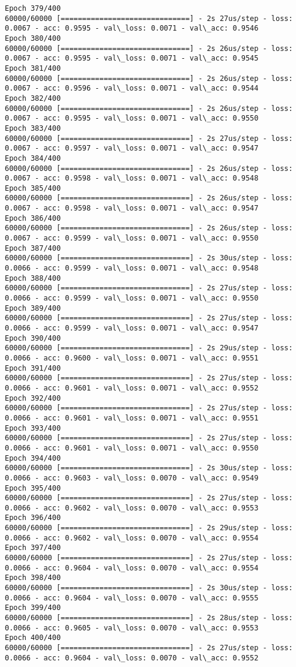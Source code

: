 \documentclass[11pt]{article}
\begin{document}
\begin{Verbatim}[commandchars=\\\{\}]
Epoch 379/400
60000/60000 [==============================] - 2s 27us/step - loss: 0.0067 - acc: 0.9595 - val\_loss: 0.0071 - val\_acc: 0.9546
Epoch 380/400
60000/60000 [==============================] - 2s 26us/step - loss: 0.0067 - acc: 0.9595 - val\_loss: 0.0071 - val\_acc: 0.9545
Epoch 381/400
60000/60000 [==============================] - 2s 26us/step - loss: 0.0067 - acc: 0.9596 - val\_loss: 0.0071 - val\_acc: 0.9544
Epoch 382/400
60000/60000 [==============================] - 2s 26us/step - loss: 0.0067 - acc: 0.9595 - val\_loss: 0.0071 - val\_acc: 0.9550
Epoch 383/400
60000/60000 [==============================] - 2s 27us/step - loss: 0.0067 - acc: 0.9597 - val\_loss: 0.0071 - val\_acc: 0.9547
Epoch 384/400
60000/60000 [==============================] - 2s 26us/step - loss: 0.0067 - acc: 0.9598 - val\_loss: 0.0071 - val\_acc: 0.9548
Epoch 385/400
60000/60000 [==============================] - 2s 26us/step - loss: 0.0067 - acc: 0.9598 - val\_loss: 0.0071 - val\_acc: 0.9547
Epoch 386/400
60000/60000 [==============================] - 2s 26us/step - loss: 0.0067 - acc: 0.9599 - val\_loss: 0.0071 - val\_acc: 0.9550
Epoch 387/400
60000/60000 [==============================] - 2s 30us/step - loss: 0.0066 - acc: 0.9599 - val\_loss: 0.0071 - val\_acc: 0.9548
Epoch 388/400
60000/60000 [==============================] - 2s 27us/step - loss: 0.0066 - acc: 0.9599 - val\_loss: 0.0071 - val\_acc: 0.9550
Epoch 389/400
60000/60000 [==============================] - 2s 27us/step - loss: 0.0066 - acc: 0.9599 - val\_loss: 0.0071 - val\_acc: 0.9547
Epoch 390/400
60000/60000 [==============================] - 2s 29us/step - loss: 0.0066 - acc: 0.9600 - val\_loss: 0.0071 - val\_acc: 0.9551
Epoch 391/400
60000/60000 [==============================] - 2s 27us/step - loss: 0.0066 - acc: 0.9601 - val\_loss: 0.0071 - val\_acc: 0.9552
Epoch 392/400
60000/60000 [==============================] - 2s 27us/step - loss: 0.0066 - acc: 0.9601 - val\_loss: 0.0071 - val\_acc: 0.9551
Epoch 393/400
60000/60000 [==============================] - 2s 27us/step - loss: 0.0066 - acc: 0.9601 - val\_loss: 0.0071 - val\_acc: 0.9550
Epoch 394/400
60000/60000 [==============================] - 2s 30us/step - loss: 0.0066 - acc: 0.9603 - val\_loss: 0.0070 - val\_acc: 0.9549
Epoch 395/400
60000/60000 [==============================] - 2s 27us/step - loss: 0.0066 - acc: 0.9602 - val\_loss: 0.0070 - val\_acc: 0.9553
Epoch 396/400
60000/60000 [==============================] - 2s 29us/step - loss: 0.0066 - acc: 0.9602 - val\_loss: 0.0070 - val\_acc: 0.9554
Epoch 397/400
60000/60000 [==============================] - 2s 27us/step - loss: 0.0066 - acc: 0.9604 - val\_loss: 0.0070 - val\_acc: 0.9554
Epoch 398/400
60000/60000 [==============================] - 2s 30us/step - loss: 0.0066 - acc: 0.9604 - val\_loss: 0.0070 - val\_acc: 0.9555
Epoch 399/400
60000/60000 [==============================] - 2s 28us/step - loss: 0.0066 - acc: 0.9605 - val\_loss: 0.0070 - val\_acc: 0.9553
Epoch 400/400
60000/60000 [==============================] - 2s 27us/step - loss: 0.0066 - acc: 0.9604 - val\_loss: 0.0070 - val\_acc: 0.9552

    \end{Verbatim}
\end{document}
